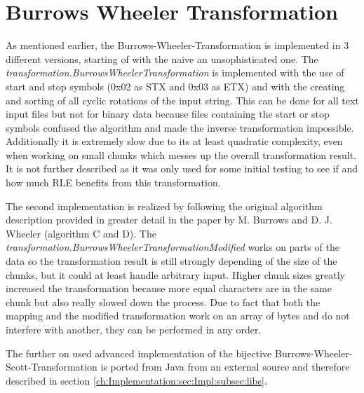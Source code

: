 \section{Burrows Wheeler Transformation}
\label{ch:Implementation:bwt}
\par{
	As mentioned earlier, the Burrows-Wheeler-Transformation is implemented in 3 different versions, starting of with the naive an unsophisticated one. The \emph{transformation.BurrowsWheelerTransformation} is implemented with the use of start and stop symbols (0x02 as STX and 0x03 as ETX) and with the creating and sorting of all cyclic rotations of the input string. This can be done for all text input files but not for binary data because files containing the start or stop symbols confused the algorithm and made the inverse transformation impossible. Additionally it is extremely slow due to its at least quadratic complexity, even when working on small chunks which messes up the overall transformation result. It is not further described as it was only used for some initial testing to see if and how much RLE benefits from this transformation. 
}
\par{
	The second implementation is realized by following the original algorithm description provided in greater detail in the paper by M. Burrows and D. J. Wheeler \cite{Burrows94} (algorithm C and D). The \emph{transformation.BurrowsWheelerTransformationModified} works on parts of the data so the transformation result is still strongly depending of the size of the chunks, but it could at least handle arbitrary input. Higher chunk sizes greatly increased the transformation because more equal characters are in the same chunk but also really slowed down the process. Due to fact that both the mapping and the modified transformation work on an array of bytes and do not interfere with another, they can be performed in any order.
}

\par{
	The further on used advanced implementation of the bijective Burrows-Wheeler-Scott-Transformation is ported from Java from an external source and therefore described in section \ref{ch:Implementation:sec:Impl:subsec:libs}.
}
